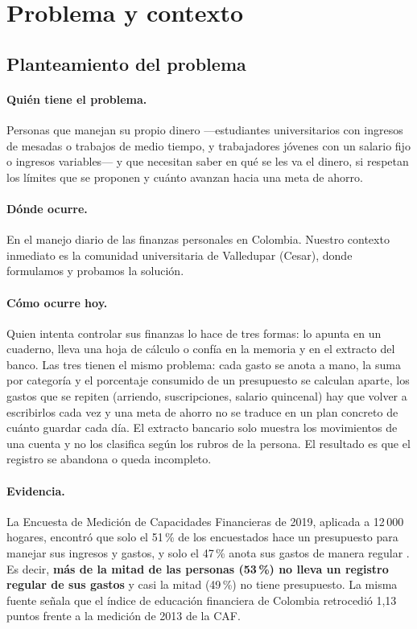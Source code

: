\section{Problema y contexto}

\subsection{Planteamiento del problema}

\paragraph{Quién tiene el problema.} Personas que manejan su propio dinero —estudiantes universitarios con ingresos de mesadas o trabajos de medio tiempo, y trabajadores jóvenes con un salario fijo o ingresos variables— y que necesitan saber en qué se les va el dinero, si respetan los límites que se proponen y cuánto avanzan hacia una meta de ahorro.

\paragraph{Dónde ocurre.} En el manejo diario de las finanzas personales en Colombia. Nuestro contexto inmediato es la comunidad universitaria de Valledupar (Cesar), donde formulamos y probamos la solución.

\paragraph{Cómo ocurre hoy.} Quien intenta controlar sus finanzas lo hace de tres formas: lo apunta en un cuaderno, lleva una hoja de cálculo o confía en la memoria y en el extracto del banco. Las tres tienen el mismo problema: cada gasto se anota a mano, la suma por categoría y el porcentaje consumido de un presupuesto se calculan aparte, los gastos que se repiten (arriendo, suscripciones, salario quincenal) hay que volver a escribirlos cada vez y una meta de ahorro no se traduce en un plan concreto de cuánto guardar cada día. El extracto bancario solo muestra los movimientos de una cuenta y no los clasifica según los rubros de la persona. El resultado es que el registro se abandona o queda incompleto.

\paragraph{Evidencia.} La Encuesta de Medición de Capacidades Financieras de 2019, aplicada a 12\,000 hogares, encontró que solo el 51\,\% de los encuestados hace un presupuesto para manejar sus ingresos y gastos, y solo el 47\,\% anota sus gastos de manera regular \parencite{asobancaria2021}. Es decir, \textbf{más de la mitad de las personas (53\,\%) no lleva un registro regular de sus gastos} y casi la mitad (49\,\%) no tiene presupuesto. La misma fuente señala que el índice de educación financiera de Colombia retrocedió 1,13 puntos frente a la medición de 2013 de la CAF.


